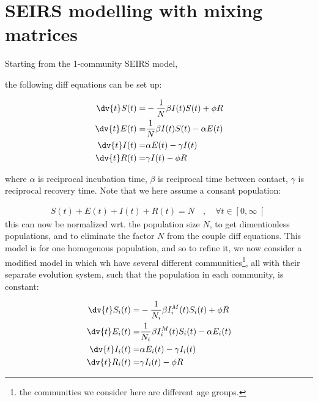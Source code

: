 
\section{SEIRS modelling with mixing matrices}

Starting from the 1-community SEIRS model, 

\begin{figure}[H]
\centering

\end{figure}

the following diff equations can be set up:

\begin{align*}
\dv{t}S(t) =& - \frac{1}{N} \beta I(t) S(t) + \phi R \\
\dv{t}E(t) =& \frac{1}{N} \beta I(t)S(t) - \alpha E(t) \\
\dv{t}I(t) =& \alpha E(t) - \gamma I(t) \\
\dv{t}R(t) =& \gamma I(t) - \phi R
\end{align*}

where $\alpha$ is reciprocal incubation time,
$\beta$ is reciprocal time between contact,
$\gamma$ is reciprocal recovery time.
Note that we here assume a consant population:

\begin{align*}
S(t) + E(t) + I(t) + R(t) = N \quad , \quad \forall t \in \left[ 0, \infty \right[ %
\end{align*}
this can now be normalized wrt. the population size $N$, to get dimentionless populations, and to eliminate the factor $N$ from the couple diff equations.
This model is for one homogenous population, and so to refine it, we now consider a modified model in which wh have several different communities\footnote{the communities we consider here are different age groups.}, all with their separate evolution system, such that the population in each community, is constant:

\begin{align*}
\dv{t}S_{i}(t) =& - \frac{1}{N_{i}} \beta I^{M}_{i}(t) S_{i}(t) + \phi R \\
\dv{t}E_{i}(t) =& \frac{1}{N_{i}} \beta I^{M}_{i}(t)S_{i}(t) - \alpha E_{i}(t) \\
\dv{t}I_{i}(t) =& \alpha E_{i}(t) - \gamma I_{i}(t) \\
\dv{t}R_{i}(t) =& \gamma I_{i}(t) - \phi R
\end{align*}

